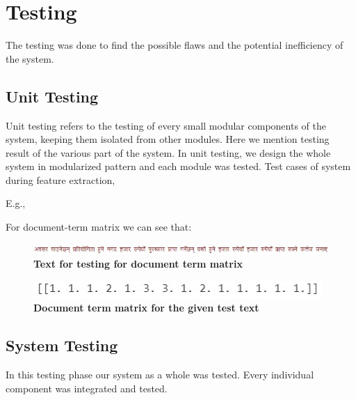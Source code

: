 \documentclass[12pt]{report}
\begin{document}
        \section{Testing}
        The testing was done to find the possible flaws and the potential inefficiency of the system.

        \subsection{Unit Testing}
        Unit testing refers to the testing of every small modular components of the system, keeping them isolated from other modules.
        Here we mention testing result of the various part of the system. In unit testing, we design the whole system in modularized pattern and
        each module was tested.
        Test cases of system during feature extraction,

        E.g.,

            For document-term matrix we can see that:
            \begin{figure}[h]
                \centering
                \includegraphics[scale=0.7]{testText.jpg}
                \caption{\textbf{Text for testing for document term matrix}}
            \end{figure}
            \begin{figure}[h]
                \centering
                \includegraphics{docTerm.jpg}
                \caption{\textbf{ Document term matrix for the given test text}}
            \end{figure}


        \subsection{System Testing}
        In this testing phase our system as a whole was tested. Every individual component was integrated and tested.
\end{document}
